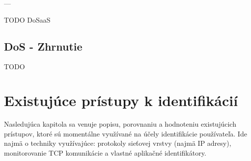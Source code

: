 \documentclass[
  printed, %
  table,   %
  lof,     %
  lot,     %
]{fithesis3}
\begin{document}
---

TODO DoSaaS



\section{DoS - Zhrnutie}
TODO




\chapter{Existujúce prístupy k identifikácií}
\label{ch:existing}
Nasledujúca kapitola sa venuje popisu, porovnaniu a hodnoteniu existujúcich
prístupov, ktoré sú momentálne využívané na účely identifikácie používateľa.
Ide najmä o techniky využívajúce: protokoly sieťovej vrstvy (najmä IP adresy),
monitorovanie TCP komunikácie a vlastné aplikačné identifikátory.
\end{document}
